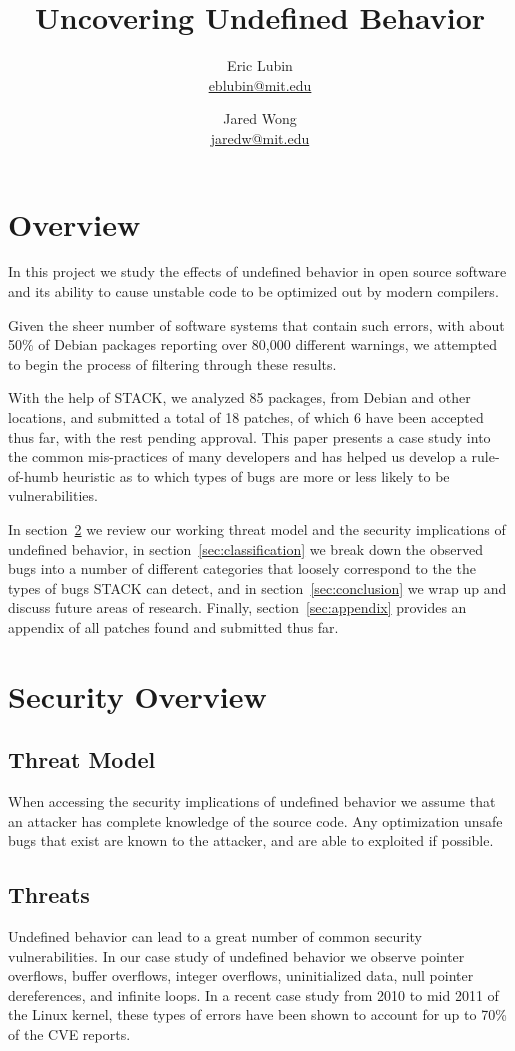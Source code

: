 \documentclass[9pt,twocolumn]{article}
\title{Uncovering Undefined Behavior}
\author{
    Eric Lubin\\
    \href{mailto:eblubin@mit.edu}{eblubin@mit.edu}
\and
    Jared Wong\\
    \href{mailto:jaredw@mit.edu}{jaredw@mit.edu}
}
\newcommand{\NumPackages}{85 }
\newcommand{\NumPatches}{18 }
\newcommand{\NumPatchesAccepted}{6 }
\begin{document}
\maketitle

\section{Overview}
In this project we study the effects of undefined behavior in open source software
and its ability to cause unstable code to be optimized out by modern compilers.

Given the sheer number of software systems that contain such errors, 
with about 50\% of Debian packages reporting over 80,000 different warnings,
we attempted to begin the process of filtering through these results. 

With the help of STACK\cite{stack}, we analyzed \NumPackages packages, 
from Debian and other locations, and submitted a total of \NumPatches patches, 
of which \NumPatchesAccepted have been accepted thus far, with the rest pending approval.
This paper presents a case study into the common mis-practices of many developers and
has helped us develop a rule-of-humb heuristic as to which types of bugs are more
or less likely to be vulnerabilities.

In section~\ref{sec:security} we review our working threat model and the
security implications of undefined behavior, in
section~\ref{sec:classification} we break down the observed bugs into a number
of different categories that loosely correspond to the the types of bugs STACK
can detect, and in section~\ref{sec:conclusion} we wrap up and discuss future
areas of research. Finally, section~\ref{sec:appendix} provides an appendix of
all patches found and submitted thus far.

\section{Security Overview}
\label{sec:security}
\subsection{Threat Model}
When accessing the security implications of undefined behavior we assume that
an attacker has complete knowledge of the source code. Any optimization unsafe
bugs that exist are known to the attacker, and are able to exploited if
possible.

\subsection{Threats}
Undefined behavior can lead to a great number of common security
vulnerabilities. In our case study of undefined behavior we observe pointer
overflows, buffer overflows, integer overflows, uninitialized data, null
pointer dereferences, and infinite loops. In a recent case study from 2010 to
mid 2011 \cite{chen-kbugs} of the Linux kernel, these types of errors have been
shown to account for up to 70\% of the CVE reports.
\end{document}
